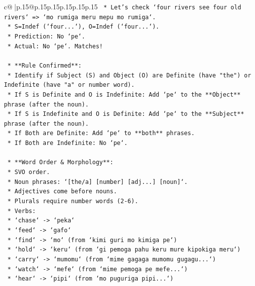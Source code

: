 \documentclass{article}
\begin{document}
{\begin{supertabular}{c@{$\;$}|p{.15\linewidth}@{}p{.15\linewidth}p{.15\linewidth}p{.15\linewidth}p{.15\linewidth}p{.15\linewidth}}
{{{\texttt{                *   Let's check `four rivers see four old rivers` => `mo rumiga meru mepu mo rumiga`.} \\
\texttt{                    *   S=Indef (`four...`), O=Indef (`four...`).} \\
\texttt{                    *   Prediction: No `pe`.} \\
\texttt{                    *   Actual: No `pe`. Matches!} \\
\\ 
\texttt{    *   **Rule Confirmed**:} \\
\texttt{        *   Identify if Subject (S) and Object (O) are Definite (have "the") or Indefinite (have "a" or number word).} \\
\texttt{        *   If S is Definite and O is Indefinite: Add `pe` to the **Object** phrase (after the noun).} \\
\texttt{        *   If S is Indefinite and O is Definite: Add `pe` to the **Subject** phrase (after the noun).} \\
\texttt{        *   If Both are Definite: Add `pe` to **both** phrases.} \\
\texttt{        *   If Both are Indefinite: No `pe`.} \\
\\ 
\texttt{    *   **Word Order \& Morphology**:} \\
\texttt{        *   SVO order.} \\
\texttt{        *   Noun phrases: `{[}the/a{]} {[}number{]} {[}adj...{]} {[}noun{]}`.} \\
\texttt{        *   Adjectives come before nouns.} \\
\texttt{        *   Plurals require number words (2{-}6).} \\
\texttt{        *   Verbs:} \\
\texttt{            *   `chase` {-}> `peka`} \\
\texttt{            *   `feed` {-}> `gafo`} \\
\texttt{            *   `find` {-}> `mo` (from `kimi guri mo kimiga pe`)} \\
\texttt{            *   `hold` {-}> `keru` (from `gi pemoga pahu keru mure kipokiga meru`)} \\
\texttt{            *   `carry` {-}> `mumomu` (from `mime gagaga mumomu gugagu...`)} \\
\texttt{            *   `watch` {-}> `mefe` (from `mime pemoga pe mefe...`)} \\
\texttt{            *   `hear` {-}> `pipi` (from `mo puguriga pipi...`)} \\
}}}
\end{supertabular}}
\end{document}
